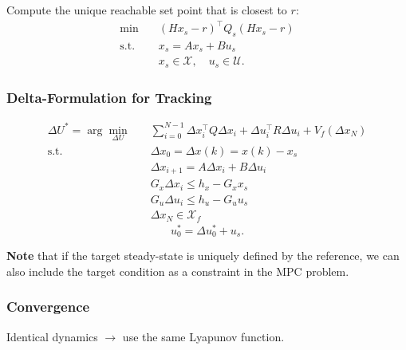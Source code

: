 
Compute the unique reachable set point that is closest to $r$:
\begin{align*}
    \min\quad    & {\left(Hx_s -r\right)}^\top Q_s \left(Hx_s -r\right) \\
    \text{s.t. } & x_s = Ax_s + Bu_s                                    \\
                 & x_s \in \mathcal{X}, \quad u_s \in \mathcal{U}.
\end{align*}

\subsubsection{Delta-Formulation for Tracking}
\noindent
\begin{align*}
    \Delta U^* = \arg\min_{\Delta U} \quad & \sum_{i=0}^{N-1} \Delta x_i^\top Q \Delta x_i + \Delta u_i^\top R \Delta u_i + V_f(\Delta x_N) \\
    \text{s.t.} \quad                      & \Delta x_0 = \Delta x(k) = x(k)-x_s                                                            \\
                                           & \Delta x_{i+1} = A \Delta x_i + B \Delta u_i                                                   \\
                                           & G_x \Delta x_i \leq h_x - G_x x_s                                                              \\
                                           & G_u \Delta u_i \leq h_u - G_u u_s                                                              \\
                                           & \Delta x_N \in \mathcal{X}_f
\end{align*}
\begin{equation*}
    u_0^* = \Delta u_0^* + u_s.
\end{equation*}

\textbf{Note} that if the target steady-state is uniquely defined by the reference, we can also include the target condition as a constraint in the MPC problem.

\subsubsection{Convergence}

Identical dynamics $\to$ use the same Lyapunov function.

